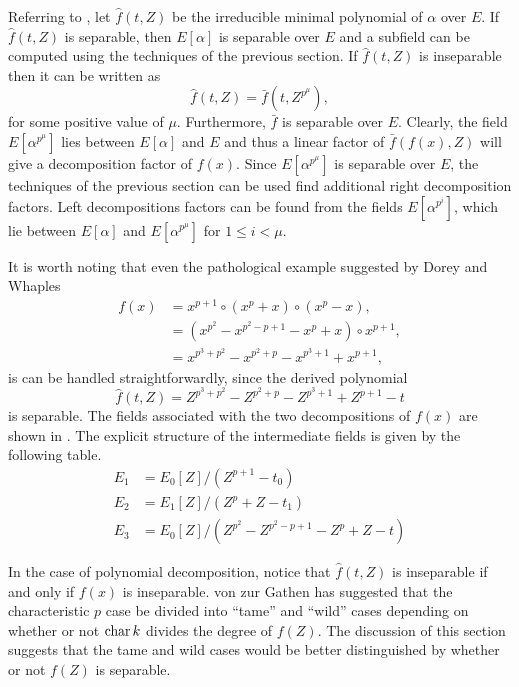 Referring to , let $\hat{f}(t, Z)$ be
the irreducible minimal polynomial of $\alpha$ over $E$. If
$\hat{f}(t, Z)$ is separable, then $E[\alpha]$ is separable over $E$
and a subfield can be computed using the techniques of the previous
section.  If $\hat{f}(t, Z)$ is inseparable then it can be written as
\[
\hat{f}(t, Z) = \bar{f}(t, Z^{p^\mu}),
\]
for some positive value of $\mu$.  Furthermore, $\bar{f}$ is separable
over $E$. Clearly, the field $E[\alpha^{p^\mu}]$ lies between
$E[\alpha]$ and $E$ and thus a linear factor of $\bar{f}(f(x), Z)$
will give a decomposition factor of $f(x)$.  Since $E[\alpha^{p^\mu}]$
is separable over $E$, the techniques of the previous section can be
used find additional right decomposition factors.  Left decompositions
factors can be found from the fields $E[\alpha^{p^i}]$, which lie
between $E[\alpha]$ and $E[\alpha^{p^\mu}]$ for $1 \le i < \mu$.

It is worth noting that even the pathological example suggested by Dorey
and Whaples 
\[
\begin{aligned}
  f(x) & = x^{p+1} \circ (x^p + x) \circ (x^p - x), \\
       & = (x^{p^2} - x^{p^2-p+1} - x^p + x) \circ x^{p+1}, \\
       & = x^{p^3+p^2} - x^{p^2+p} - x^{p^3+1} + x^{p+1},
\end{aligned}
\]
is can be handled straightforwardly, since the derived polynomial 
\[
\hat{f}(t, Z) = 
Z^{p^3+p^2} - Z^{p^2+p} - Z^{p^3+1} + Z^{p+1} - t
\]
is separable.  The fields associated with the two decompositions of $f(x)$
are shown in .  The explicit structure of the
intermediate fields is given by the following table.
\[
\begin{aligned}
  E_1 &= E_0[Z]/(Z^{p+1} - t_0) \\
  E_2 &= E_1[Z]/(Z^p+Z -t_1) \\
  E_3 &= E_0[Z]/(Z^{p^2} - Z^{p^2-p+1}- Z^p+Z-t)
\end{aligned}
\]

In the case of polynomial decomposition, notice that $\hat{f}(t, Z)$
is inseparable if and only if $f(x)$ is inseparable.  von zur Gathen
\cite{Gathen90a} has suggested that the characteristic $p$
case be divided into ``tame'' and ``wild'' cases depending on whether
or not $\mathop{\rm char}\nolimits k$ divides the degree of $f(Z)$.  The discussion of this
section suggests that the tame and wild cases would be better
distinguished by whether or not $f(Z)$ is separable.

